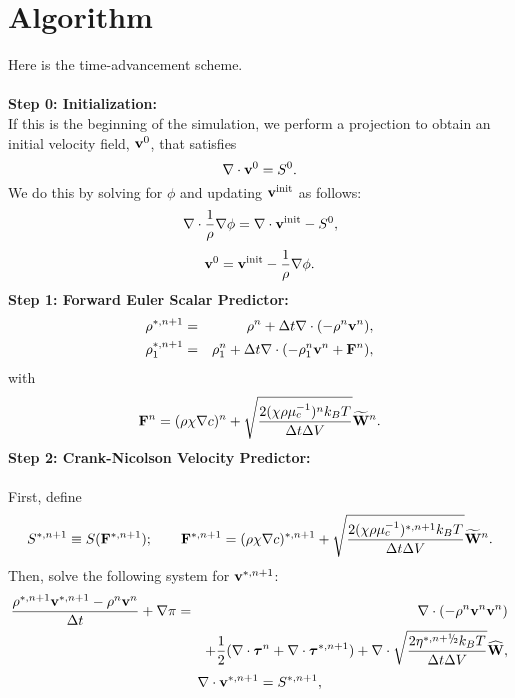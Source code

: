 \documentclass[final]{siamltex}
\newcommand{\sfrac}[2]{\mathchoice
  {\kern0em\raise.5ex\hbox{\the\scriptfont0 #1}\kern-.15em/
   \kern-.15em\lower.25ex\hbox{\the\scriptfont0 #2}}
  {\kern0em\raise.5ex\hbox{\the\scriptfont0 #1}\kern-.15em/
   \kern-.15em\lower.25ex\hbox{\the\scriptfont0 #2}}
  {\kern0em\raise.5ex\hbox{\the\scriptscriptfont0 #1}\kern-.2em/
   \kern-.15em\lower.25ex\hbox{\the\scriptscriptfont0 #2}}
  {#1\!/#2}}
\def\Fb {{\bf F}}
\def\vb {{\bf v}}
\def\Wb {{\bf W}}
\def\taub {\boldsymbol{\tau}}
\def\half   {\frac{1}{2}}
\def\myhalf {\sfrac{1}{2}}
\begin{document}
\section{Algorithm}
Here is the time-advancement scheme.\\ \\
{\bf Step 0: Initialization:}\\

If this is the beginning of the simulation, we perform a projection to obtain an initial 
velocity field, $\vb^0$, that satisfies
\begin{equation}
\nabla\cdot\vb^0 = S^0.
\end{equation}
We do this by solving for $\phi$ and updating $\vb^{\rm init}$ as follows:
\begin{equation}
\nabla\cdot\frac{1}{\rho}\nabla\phi = \nabla\cdot\vb^{\rm init} - S^0,
\end{equation}
\begin{equation}
\vb^0 = \vb^{\rm init} - \frac{1}{\rho}\nabla\phi.
\end{equation}
{\bf Step 1: Forward Euler Scalar Predictor:}
\begin{eqnarray}
\rho^{*,n+1} &=& \rho^n + \Delta t\nabla\cdot(-\rho^n\vb^n),\\
\rho_1^{*,n+1} &=& \rho_1^n + \Delta t\nabla\cdot(-\rho_1^n\vb^n + \Fb^n),
\end{eqnarray}
with
\begin{equation}
\Fb^n = (\rho\chi\nabla c)^n + \sqrt{\frac{2(\chi\rho\mu_c^{-1})^nk_BT}{\Delta t\Delta V}}\widetilde\Wb^n.
\end{equation}
{\bf Step 2: Crank-Nicolson Velocity Predictor:}\\ \\
First, define
\begin{equation}
S^{*,n+1} \equiv S(\Fb^{*,n+1});
\qquad
\Fb^{*,n+1} = (\rho\chi\nabla c)^{*,n+1} + \sqrt{\frac{2(\chi\rho\mu_c^{-1})^{*,n+1}k_BT}{\Delta t\Delta V}}\widetilde\Wb^n.
\end{equation}
Then, solve the following system for $\vb^{*,n+1}$:
\begin{eqnarray}
\frac{\rho^{*,n+1}\vb^{*,n+1} - \rho^n\vb^n}{\Delta t} + \nabla\pi &=& \nabla\cdot(-\rho^n\vb^n\vb^n)\nonumber\\
&&+ \half(\nabla\cdot\taub^n + \nabla\cdot\taub^{*,n+1}) + \nabla\cdot\sqrt{\frac{2\eta^{*,n+\myhalf} k_B T}{\Delta t\Delta V}}\widehat\Wb,\label{eq:CN Vel Pred}
\end{eqnarray}
\begin{equation}
\nabla\cdot\vb^{*,n+1} = S^{*,n+1},
\end{equation}
\end{document}
